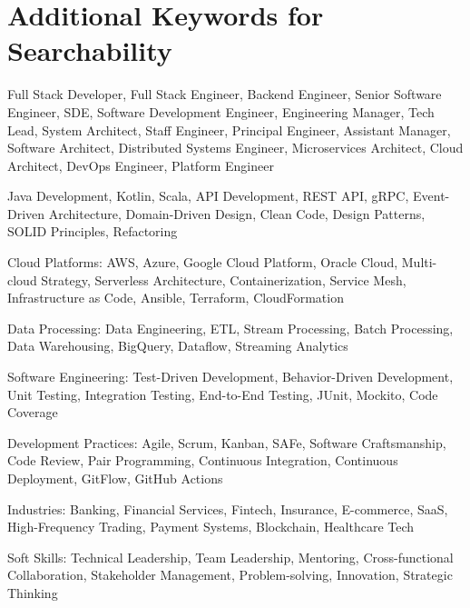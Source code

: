 \documentclass[]{hanisntsolo-resume}
\begin{document}
\sectionsep


\section{Additional Keywords for Searchability}

Full Stack Developer, Full Stack Engineer, Backend Engineer, Senior Software Engineer, SDE, Software Development Engineer, Engineering Manager, Tech Lead, System Architect, Staff Engineer, Principal Engineer, Assistant Manager, Software Architect, Distributed Systems Engineer, Microservices Architect, Cloud Architect, DevOps Engineer, Platform Engineer

Java Development, Kotlin, Scala, API Development, REST API, gRPC, Event-Driven Architecture, Domain-Driven Design, Clean Code, Design Patterns, SOLID Principles, Refactoring

Cloud Platforms: AWS, Azure, Google Cloud Platform, Oracle Cloud, Multi-cloud Strategy, Serverless Architecture, Containerization, Service Mesh, Infrastructure as Code, Ansible, Terraform, CloudFormation

Data Processing: Data Engineering, ETL, Stream Processing, Batch Processing, Data Warehousing, BigQuery, Dataflow, Streaming Analytics

Software Engineering: Test-Driven Development, Behavior-Driven Development, Unit Testing, Integration Testing, End-to-End Testing, JUnit, Mockito, Code Coverage

Development Practices: Agile, Scrum, Kanban, SAFe, Software Craftsmanship, Code Review, Pair Programming, Continuous Integration, Continuous Deployment, GitFlow, GitHub Actions

Industries: Banking, Financial Services, Fintech, Insurance, E-commerce, SaaS, High-Frequency Trading, Payment Systems, Blockchain, Healthcare Tech

Soft Skills: Technical Leadership, Team Leadership, Mentoring, Cross-functional Collaboration, Stakeholder Management, Problem-solving, Innovation, Strategic Thinking
\end{document}
